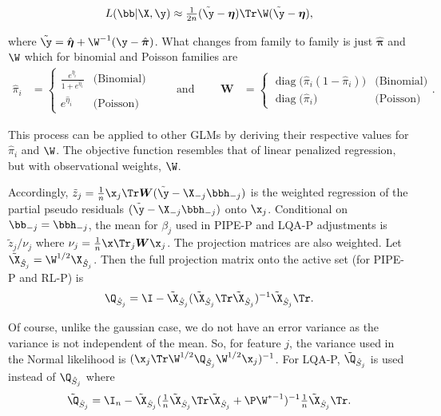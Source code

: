 $$
L(\bb|\X,\y) \approx \tfrac{1}{2n} (\tilde{\y} - \boldsymbol{\eta}) \Tr \W (\tilde{\y} - \boldsymbol{\eta}),
$$

\noindent where $\tilde{\y} = \hat{\boldsymbol{\eta}} + \W^{-1}(\y - \hat{\boldsymbol{\pi}})$. What changes from family to family is just $\hat{\boldsymbol{\pi}}$ and $\W$ which for binomial and Poisson families are
$$
\begin{aligned}
\hat{\pi}_i &=
\begin{cases}
\displaystyle
\frac{e^{\hat{\eta}_i}}{1+e^{\hat{\eta}_i}}
  & \text{(Binomial)}\\[10pt]
\displaystyle
e^{\hat{\eta}_i}
  & \text{(Poisson)}
\end{cases}
\qquad\text{ and } \qquad
\mathbf W &=
\begin{cases}
\operatorname{diag}\!\bigl(\hat{\pi}_i(1-\hat{\pi}_i)\bigr)
  & \text{(Binomial)}\\[10pt]
\operatorname{diag}\!\bigl(\hat{\pi}_i\bigr)
  & \text{(Poisson)}
\end{cases}.
\end{aligned}
$$


\noindent This process can be applied to other GLMs by deriving their respective values for $\hat{\pi}_i$ and $\W$. The objective function resembles that of linear penalized regression, but with observational weights, $\W$. 

Accordingly, $\tilde{z}_j = \frac{1}{n}\x_j \Tr\boldsymbol{W} (\tilde{\y} -  \X_{-j} \bbh_{-j})$ is the weighted regression of the partial pseudo residuals $(\tilde{\y} -  \X_{-j} \bbh_{-j})$ onto $\x_j$. Conditional on $\bb_{-j} = \bbh_{-j}$, the mean for $\beta_j$ used in PIPE-P and LQA-P adjustments is $\tilde{z}_j / \nu_j$ where $\nu_j = \frac{1}{n} \x \Tr_j \boldsymbol{W} \x_j$. The projection matrices are also weighted. Let $\tilde{\X}_{\hat{S}_j} = \W^{1/2} \X_{\hat{S}_j}$. Then the full projection matrix onto the active set (for PIPE-P and RL-P) is
$$
\Q_{\hat{S}_j} = \I - \tilde{\X}_{\hat{S}_j}(\tilde{\X}_{\hat{S}_j} \Tr \tilde{\X}_{\hat{S}_j})^{-1} \tilde{\X}_{\hat{S}_j} \Tr.
$$

\noindent Of course, unlike the gaussian case, we do not have an error variance as the variance is not independent of the mean. So, for feature $j$, the variance used in the Normal likelihood is $(\x_j \Tr \W^{1/2} \Q_{\hat{S}_j} \W^{1/2}\x_j)^{-1}$. For LQA-P, $\tilde{\Q}_{\hat{S}_j}$ is used instead of $\Q_{\hat{S}_j}$ where
$$\tilde{\Q}_{\hat{S}_j} = \I_n - \tilde{\X}_{\hat{S}_j}(\tfrac{1}{n}\tilde{\X}_{\hat{S}_j} \Tr\tilde{\X}_{\hat{S}_j} + \P\W^{*-1})^{-1}\tfrac{1}{n}\tilde{\X}_{\hat{S}_j} \Tr.$$

